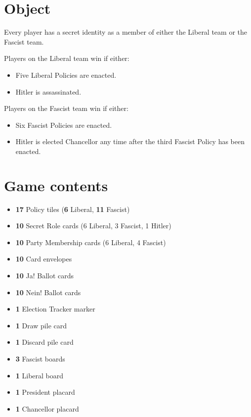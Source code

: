 \documentclass[13pt,a4paper,twocolumn,titlepage]{scrartcl}
\begin{document}
	\section*{Object}
	Every player has a secret identity as a member of either the \textcolor{liberal}{​Liberal} team or the \textcolor{fascist}{​Fascist} team.
	
	\textcolor{liberal}{​Players on the Liberal team win if either:
	\begin{itemize}
		\item Five Liberal Policies are enacted.
		\item Hitler is assassinated.
	\end{itemize}
	}

	\textcolor{fascist}{​Players on the Fascist team win if either:
	\begin{itemize}
		\item Six Fascist Policies are enacted.
		\item Hitler is elected Chancellor any time after the third Fascist Policy has been enacted.
	\end{itemize}
	}

	\section*{Game contents}
	\begin{itemize}
		\item \textbf{17} Policy tiles (\textcolor{liberal}{\textbf{6} Liberal}, \textcolor{fascist}{\textbf{11} Fascist})
		\item \textbf{10} Secret Role cards (6 \textcolor{liberal}{Liberal}, 3 \textcolor{fascist}{Fascist}, 1 \textcolor{fascist}{Hitler})
		\item \textbf{10} Party Membership cards (6 \textcolor{liberal}{Liberal}, 4 \textcolor{fascist}{Fascist})
		\item \textbf{10} Card envelopes
		\item \textbf{10} Ja! Ballot cards
		\item \textbf{10} Nein! Ballot cards
		\item \textbf{1} Election Tracker marker
		\item \textbf{1} Draw pile card
		\item \textbf{1} Discard pile card
		\item \textbf{3} Fascist boards
		\item \textbf{1} Liberal board
		\item \textbf{1} President placard
		\item \textbf{1} Chancellor placard
	\end{itemize}
	
\end{document}
